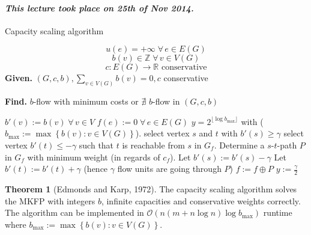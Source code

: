 \documentclass[a4paper]{article}
\theoremstyle{definition}
\newtheorem{theorem}{Theorem}
\newcommand{\set}[1]{\left\{#1\right\}}
\newcommand{\given}[1]{\textbf{Given.} #1\par}
\newcommand{\find}[1]{\textbf{Find.} #1\par}
\newcommand{\dateref}[1]{\paragraph{\textit{This lecture took place on #1.}}}
\newcommand{\gath}[2]{$#1$-$#2$-path} %
\newcommand{\fall}{\;\forall\,}
\begin{document}
\dateref{25th of Nov 2014}

\begin{algorithm}
  \caption{Capacity scaling algorithm}
  \label{min-b-flow-algo}
  \[ u(e) = +\infty \fall e \in E(G) \]
  \[ b(v) \in \mathbb{Z} \fall v \in V(G) \]
  \[ c: E(G) \rightarrow \mathbb{R} \text{ conservative} \]
  \given{$(G, c, b), \sum_{v \in V(G)} b(v) = 0, c$ conservative}
  \find{$b$-flow with minimum costs or $\nexists$ $b$-flow in $(G, c, b)$}
\begin{algorithmic}[1]
  \State $b'(v) := b(v) \fall v \in V$
  \State $f(e) := 0 \fall e \in E(G)$
    \State $y = 2^{\lfloor \log{b_{\text{max}}} \rfloor}$
      with ($b_{\text{max}} := \max\set{b(v) : v \in V(G)}$).
  \Else
     \State {}
  \EndIf
    \State {}
  \Else
    \State select vertex $s$ and $t$ with $b'(s) \geq \gamma$
    \State select vertex $b'(t) \leq -\gamma$ such that $t$ is reachable from $s$ in $G_f$.
      \State {}
    \EndIf
  \EndIf
  \State Determine a \gath st $P$ in $G_f$ with minimum weight (in regards of $c_f$).
  \State Let $b'(s) := b'(s) - \gamma$
  \State Let $b'(t) := b'(t) + \gamma$ (hence $\gamma$ flow units are going through $P$)
  \State $f := f \oplus P$
  \State {}
  \Else{}
    \State $y := \frac{\gamma}{2}$
    \State {}
  \EndIf
\end{algorithmic}
\end{algorithm}

\begin{theorem}[Edmonds and Karp, 1972]
  \label{satz-5.11}
  The capacity scaling algorithm solves the MKFP with integers $b$, infinite capacities and conservative weights correctly. The algorithm can be implemented in $\mathcal{O}(n (m + n \log{n}) \log{b_{\text{max}}})$ runtime where $b_{\text{max}} := \max\set{b(v): v \in V(G)}$.
\end{theorem}
\end{document}
